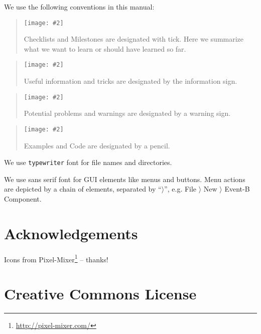 \documentclass{book}
\def\doculist#1#2{
\begin{quote}
\hspace{-10mm}
\textrm{\texttt{[image: \#2]}} %
\vspace{-8mm}

#1
\end{quote}
}
\def\tick#1{\doculist{#1}{img/tick_64.png}}
\def\info#1{\doculist{#1}{img/info_64.png}}
\def\warning#1{\doculist{#1}{img/warning_64.png}}
\def\pencil#1{\doculist{#1}{img/pencil_64.png}}
\begin{document}
We use the following conventions in this manual:

\tick{Checklists and Milestones are designated with tick. Here we summarize what we want to learn or should have learned so far.}
\info{Useful information and tricks are designated by the information sign.}
\warning{Potential problems and warnings are designated by a warning sign.}
\pencil{Examples and Code are designated by a pencil.}

We use \texttt{typewriter} font for file names and directories.

We use \textsf{sans serif font} for GUI elements like menus and buttons.  Menu actions are depicted by a chain of elements, separated by ``$\rangle$'', e.g. \textsf{File $\rangle$ New $\rangle$ Event-B Component}.

\section{Acknowledgements}

Icons from Pixel-Mixer\footnote{\url{http://pixel-mixer.com/}} -- thanks!

\section{Creative Commons License}








\end{document}
